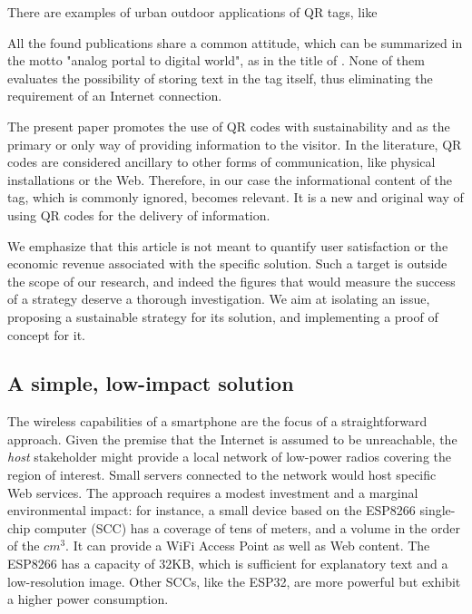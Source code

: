 \documentclass[sustainability,article,submit,pdftex,moreauthors]{Definitions/mdpi}
\begin{document}
There are examples of urban outdoor applications of QR tags, like 

All the found publications share a common attitude, which can be summarized in the motto "analog portal to digital world", as in the title of \cite{bai12a}. None of them evaluates the possibility of storing text in the tag itself, thus eliminating the requirement of an Internet connection.

The present paper promotes the use of QR codes with sustainability and as the primary or only way of providing information to the visitor. In the literature, QR codes are considered ancillary to other forms of communication, like physical installations or the Web. Therefore, in our case the informational content of the tag, which is commonly ignored, becomes relevant. It is a new and original way of using QR codes for the delivery of information.

We emphasize that this article is not meant to quantify user satisfaction or the economic revenue associated with the specific solution. Such a target is outside the scope of our research, and indeed the figures that would measure the success of a strategy deserve a thorough investigation. We aim at isolating an issue, proposing a sustainable strategy for its solution, and implementing a proof of concept for it.

\subsection{A simple, low-impact solution}


The wireless capabilities of a smartphone are the focus of a straightforward approach. Given the premise that the Internet is assumed to be unreachable, the {\em host} stakeholder might provide a local network of low-power radios covering the region of interest. Small servers connected to the network would host specific Web services. The approach requires a modest investment and a marginal environmental impact: for instance, a small device based on the ESP8266 single-chip computer (SCC) has a coverage of tens of meters, and a volume in the order of the $cm^3$. It can provide a WiFi Access Point as well as Web content. The ESP8266 has a capacity of 32KB, which is sufficient for explanatory text and a low-resolution image. Other SCCs, like the ESP32, are more powerful but exhibit a higher power consumption. 
\end{document}
